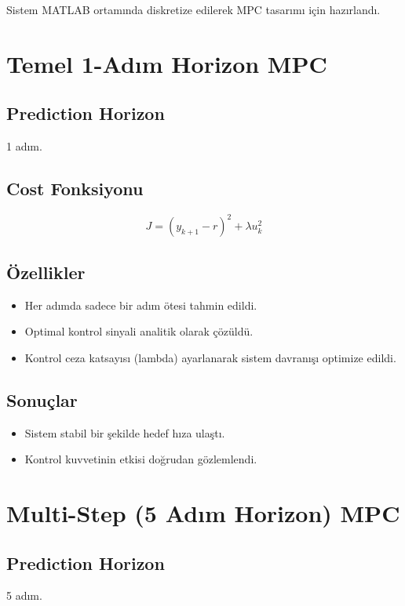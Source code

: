 \documentclass[12pt,a4paper]{article}
\begin{document}
Sistem MATLAB ortamında diskretize edilerek MPC tasarımı için hazırlandı.

\section{Temel 1-Adım Horizon MPC}

\subsection{Prediction Horizon}
1 adım.

\subsection{Cost Fonksiyonu}
\begin{equation}
J = (y_{k+1} - r)^2 + \lambda u_k^2
\end{equation}

\subsection{Özellikler}
\begin{itemize}
\item Her adımda sadece bir adım ötesi tahmin edildi.
\item Optimal kontrol sinyali analitik olarak çözüldü.
\item Kontrol ceza katsayısı (lambda) ayarlanarak sistem davranışı optimize edildi.
\end{itemize}

\subsection{Sonuçlar}
\begin{itemize}
\item Sistem stabil bir şekilde hedef hıza ulaştı.
\item Kontrol kuvvetinin etkisi doğrudan gözlemlendi.
\end{itemize}

\section{Multi-Step (5 Adım Horizon) MPC}

\subsection{Prediction Horizon}
5 adım.
\end{document}
